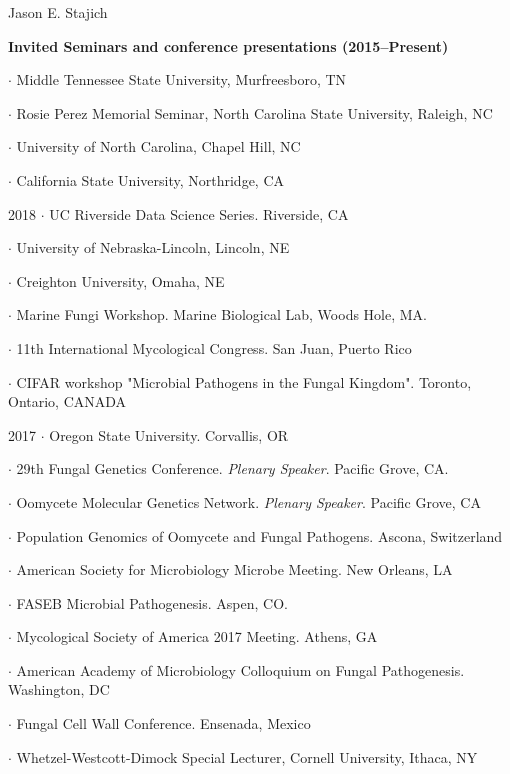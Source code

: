 \documentclass[10pt]{article}
\begin{document}
\begin{cv}{\centerline{Jason E. Stajich}}
\begin{cvlistcompact}{\bf Invited Seminars and conference presentations (2015--Present)}
\item $\cdot$ Middle Tennessee State University, Murfreesboro, TN
\item $\cdot$ Rosie Perez Memorial Seminar, North Carolina State University, Raleigh, NC
\item $\cdot$ University of North Carolina, Chapel Hill, NC
\item $\cdot$ California State University, Northridge, CA
\item [2018] $\cdot$ UC Riverside Data Science Series. Riverside, CA
\item $\cdot$ University of Nebraska-Lincoln, Lincoln, NE
\item $\cdot$ Creighton University, Omaha, NE
\item $\cdot$ Marine Fungi Workshop. Marine Biological Lab, Woods Hole, MA.
\item $\cdot$ 11th International Mycological Congress. San Juan, Puerto Rico
\item $\cdot$ CIFAR workshop "Microbial Pathogens in the Fungal Kingdom". Toronto, Ontario, CANADA
\item [2017] $\cdot$ Oregon State University. Corvallis, OR
\item $\cdot$ 29th Fungal Genetics Conference. \textit{Plenary Speaker}. Pacific Grove, CA.
\item $\cdot$ Oomycete Molecular Genetics Network. \textit{Plenary Speaker}. Pacific Grove, CA
\item $\cdot$ Population Genomics of Oomycete and Fungal Pathogens. Ascona, Switzerland
\item $\cdot$ American Society for Microbiology Microbe Meeting. New Orleans, LA
\item $\cdot$ FASEB Microbial Pathogenesis. Aspen, CO.
\item $\cdot$ Mycological Society of America 2017 Meeting. Athens, GA
\item $\cdot$ American Academy of Microbiology Colloquium on Fungal
  Pathogenesis. Washington, DC
\item $\cdot$ Fungal Cell Wall Conference. Ensenada, Mexico
\item $\cdot$ Whetzel-Westcott-Dimock Special Lecturer, Cornell University, Ithaca, NY

\end{cvlistcompact}
\end{cv}
\end{document}
